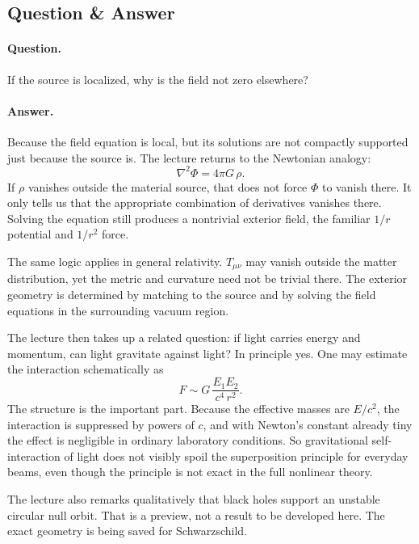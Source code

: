 \subsection{Question \& Answer}

\paragraph{Question.} If the source is localized, why is the field not zero elsewhere?

\paragraph{Answer.} Because the field equation is local, but its solutions are not compactly supported just because the source is. The lecture returns to the Newtonian analogy:
\begin{equation}
\nabla^2\Phi = 4\pi G\,\rho.
\end{equation}
If \(\rho\) vanishes outside the material source, that does not force \(\Phi\) to vanish there. It only tells us that the appropriate combination of derivatives vanishes there. Solving the equation still produces a nontrivial exterior field, the familiar \(1/r\) potential and \(1/r^2\) force.

The same logic applies in general relativity. \(T_{\mu\nu}\) may vanish outside the matter distribution, yet the metric and curvature need not be trivial there. The exterior geometry is determined by matching to the source and by solving the field equations in the surrounding vacuum region.

The lecture then takes up a related question: if light carries energy and momentum, can light gravitate against light? In principle yes. One may estimate the interaction schematically as
\begin{equation}
F \sim G\,\frac{E_1E_2}{c^4\,r^2}.
\end{equation}
The structure is the important part. Because the effective masses are \(E/c^2\), the interaction is suppressed by powers of \(c\), and with Newton's constant already tiny the effect is negligible in ordinary laboratory conditions. So gravitational self-interaction of light does not visibly spoil the superposition principle for everyday beams, even though the principle is not exact in the full nonlinear theory.

The lecture also remarks qualitatively that black holes support an unstable circular null orbit. That is a preview, not a result to be developed here. The exact geometry is being saved for Schwarzschild.

